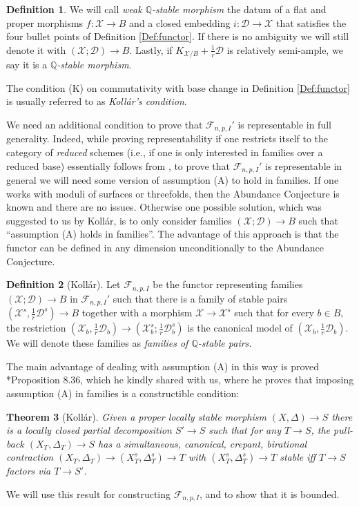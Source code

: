 \documentclass{amsart}
\newcommand{\bQ}{\mathbb{Q}}
\newcommand{\sF}{\mathscr{F}}
\newcommand{\cD}{\mathcal{D}}
\newcommand{\cX}{\mathcal{X}}
\newtheorem{theorem}{Theorem}[section]
\theoremstyle{definition}
\newtheorem{Def}[theorem]{Definition}
\def\K#1.{K_{#1}}
\begin{document}
\begin{Def}
We will call \emph{weak $\bQ$-stable morphism} the datum of a flat and proper morphisms $f \colon \cX\to B$ and a closed embedding $i \colon \cD\to \cX$ that satisfies the four bullet points of Definition \ref{Def:functor}.
If there is no ambiguity we will still denote it with $(\cX;\cD)\to B$.
Lastly, if $\K \mathcal{X}/B. + \frac{1}{r}\mathcal{D}$ is relatively semi-ample, we say it is a {\it $\bQ$-stable morphism}.
\end{Def}

The condition (K) on commutativity with base change in Definition \ref{Def:functor} is usually referred to as \emph{Koll\'ar's condition}. 

We need an additional condition to prove that $\sF_{n,p,I}'$ is representable in full generality. Indeed, while proving representability if one restricts itself to the category of \emph{reduced} schemes (i.e., if one is only interested in families over a reduced base) essentially follows from \cite{HX13}, to prove that $\sF_{n,p,I}'$ is representable in general we will need some version of assumption (A) to hold in families. If one works with moduli of surfaces or threefolds, then the Abundance Conjecture is known and there are no issues.
Otherwise one possible solution, which was suggested to us by Koll\'ar, is to only consider families $(\cX;\cD)\to B$ such that ``assumption (A) holds in families''.
The advantage of this approach is that the functor can be defined in any dimension unconditionally to the Abundance Conjecture.

\begin{Def}[Koll\'ar]\label{def families A+} Let $\sF_{n,p,I}$ be the functor representing families $(\cX;\cD)\to B$ in $\sF_{n,p,I}'$ such that
there is a family of stable pairs $(\cX^s,\frac{1}{r}\cD^s)\to B$ together with a morphism $\cX\to \cX^s$ such that for every $b\in B$, the restriction $(\cX_b,\frac{1}{r}\cD_b)\to (\cX^s_b;\frac{1}{r}\cD^s_b)$ is the canonical model of $(\cX_b,\frac{1}{r}\cD_b)$. We will denote these families as \textit{families of $\bQ$-stable pairs.}
\end{Def}
The main advantage of dealing with assumption (A) in this way
is proved \cite{kol_new}*{Proposition 8.36}, which he  kindly shared with us, where he proves that imposing assumption (A) in families is a constructible condition:

\begin{theorem}[Koll\'ar]\label{teorema kollar constructible}
Given a proper locally stable morphism
$(X,\Delta)\to S$ there is a locally closed partial decomposition $S'\to S$ such that for any $T\to S$, the pull-back $(X_T,\Delta_T)\to S$ has a simultaneous, canonical, crepant, birational contraction $(X_T,\Delta_T)\to(X_T^s,\Delta_T^s)\to T$ with $(X_T^s,\Delta_T^s)\to T$ stable iff $T\to S$ factors via $T\to S'$.
\end{theorem}
We will use this result for constructing $\sF_{n,p,I}$, and to show that it is bounded.
\end{document}
